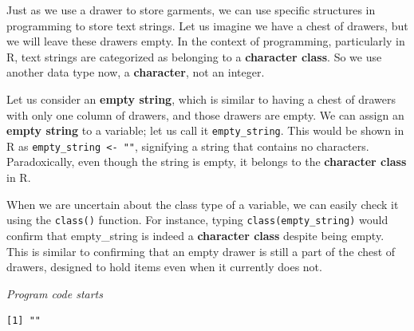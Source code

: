 Just as we use a drawer to store garments, we can use specific
structures in programming to store text strings. Let us imagine we have
a chest of drawers, but we will leave these drawers empty. In the
context of programming, particularly in R, text strings are categorized
as belonging to a \textbf{character class}. So we use another data
type now, a \textbf{character}, not an integer.

Let us consider an \textbf{empty string}, which is similar to having a chest of
drawers with only one column of drawers, and those drawers are empty. We
can assign an \textbf{empty string} to a variable; let us call it
\texttt{empty\_string}. This would be shown in R as
\texttt{empty\_string\ \textless{}-\ ""}, signifying a string that
contains no characters. Paradoxically, even though the string is empty,
it belongs to the \textbf{character class} in R.

When we are uncertain about the class type of a variable, we can easily
check it using the \texttt{class()} function. For instance, typing
\texttt{class(empty\_string)} would confirm that empty\_string is indeed
a \textbf{character class} despite being empty. This is similar to
confirming that an empty drawer is still a part of the chest of drawers,
designed to hold items even when it currently does not.

\emph{Program code starts}

\begin{Shaded}
\begin{Highlighting}[]
\OtherTok{\textless{}{-}} 

\end{Highlighting}
\end{Shaded}

\begin{verbatim}
[1] ""
\end{verbatim}

\begin{Shaded}
\begin{Highlighting}[]
\end{Highlighting}
\end{Shaded}

